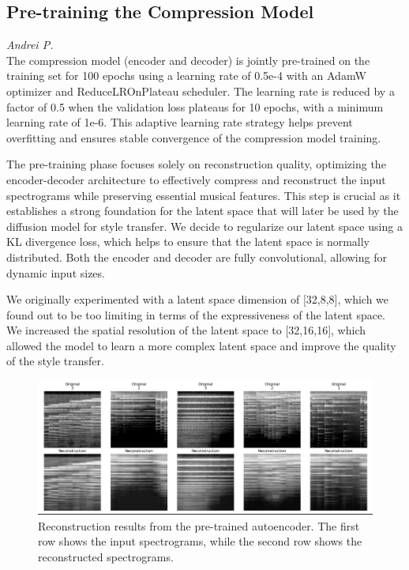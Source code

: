 \subsection{Pre-training the Compression Model}
\textit{Andrei P.}\\
The compression model (encoder and decoder) is jointly pre-trained on the training set for 100 epochs using a learning rate of 0.5e-4 with an AdamW optimizer and ReduceLROnPlateau scheduler. The learning rate is reduced by a factor of 0.5 when the validation loss plateaus for 10 epochs, with a minimum learning rate of 1e-6. This adaptive learning rate strategy helps prevent overfitting and ensures stable convergence of the compression model training.

The pre-training phase focuses solely on reconstruction quality, optimizing the encoder-decoder architecture to effectively compress and reconstruct the input spectrograms while preserving essential musical features. This step is crucial as it establishes a strong foundation for the latent space that will later be used by the diffusion model for style transfer. We decide to regularize our latent space using a KL divergence loss, which helps to ensure that the latent space is normally distributed. Both the encoder and decoder are fully convolutional, allowing for dynamic input sizes.

We originally experimented with a latent space dimension of [32,8,8], which we found out to be too limiting in terms of the expressiveness of the latent space. We increased the spatial resolution of the latent space to [32,16,16], which allowed the model to learn a more complex latent space and improve the quality of the style transfer.

\begin{figure}[h]
    \centering
    \includegraphics[width=\textwidth]{figures/reconstruction.jpeg}
    \caption{Reconstruction results from the pre-trained autoencoder. The first row shows the input spectrograms, while the second row shows the reconstructed spectrograms. }
    \label{fig:reconstruction}
\end{figure}

